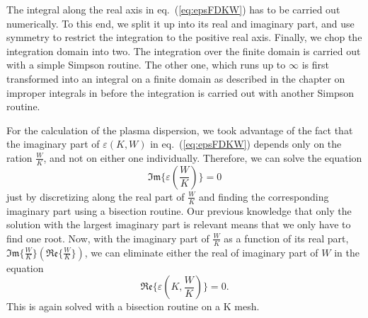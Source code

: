 \documentclass[physics,phd,nolot,nolof]{uccthesis}%
\begin{document}
The integral along the real axis in eq.~(\ref{eq:epsFDKW}) has to be carried out numerically. 
To this end, we split it up into its real and imaginary part, and use symmetry to restrict the integration to the positive real axis.
Finally, we chop the integration domain into two. The integration over the finite domain is carried out with a simple Simpson routine.
The other one, which runs up to $\infty$ is first transformed into an integral on a finite domain as described in the chapter on improper integrals in \cite{nr} before the integration is carried out with another Simpson routine.

For the calculation of the plasma dispersion, we took advantage of the fact that the imaginary part of $\varepsilon(K,W)$ in eq.~(\ref{eq:epsFDKW}) depends only on the ration $\frac{W}{K}$, and not on either one individually.
Therefore, we can solve the equation 
\begin{equation}
	\mathfrak{Im}\{\varepsilon(\frac{W}{K})\}=0  
	\label{eq:imepszero}
\end{equation}
just by discretizing along the real part of $\frac{W}{K}$ and finding the corresponding imaginary part using a bisection routine. 
Our previous knowledge that only the solution with the largest imaginary part is relevant means that we only have to find one root. 
Now, with the imaginary part of $\frac{W}{K}$ as a function of its real part,
$\mathfrak{Im}\{\frac{W}{K}\}\left(\mathfrak{Re}\{\frac{W}{K}\}\right)$,
we can eliminate either the real of imaginary part of $W$ in the equation
\begin{equation}
	\mathfrak{Re}\{\varepsilon(K,\frac{W}{K})\}=0 . 
	\label{eq:reepszero}
\end{equation}
This is again solved with a bisection routine on a K mesh. 
\end{document}
